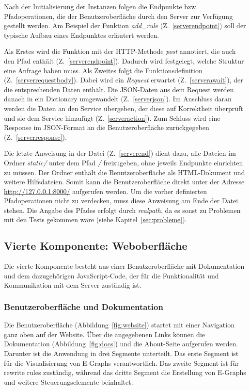 Nach der Initialisierung der Instanzen folgen die Endpunkte bzw. Pfadoperationen, die der Benutzeroberfläche durch den Server zur Verfügung gestellt werden.
Am Beispiel der Funktion \textit{add\_rule} (Z.~\ref{serverendpoint}) soll der typische Aufbau eines Endpunktes erläutert werden.

Als Erstes wird die Funktion mit der HTTP-Methode \textit{post} annotiert, die auch den Pfad enthält (Z.~\ref{serverendpoint}).
Dadurch wird festgelegt, welche Struktur eine Anfrage haben muss.
Als Zweites folgt die Funktionsdefinition (Z.~\ref{serverrequestbody}). Dabei wird ein \textit{Request} erwartet (Z.~\ref{serverawait}), der die entsprechenden Daten enthält. 
Die JSON-Daten aus dem Request werden danach in ein Dictionary umgewandelt (Z.~\ref{serverjson}).
Im Anschluss daran werden die Daten an den Service übergeben, der diese auf Korrektheit überprüft und sie dem Service hinzufügt (Z.~\ref{serveraction}).
Zum Schluss wird eine Response im JSON-Format an die Benutzeroberfläche zurückgegeben (Z.~\ref{serverresponse}).

Die letzte Anweisung in der Datei (Z.~\ref{serverend}) dient dazu, alle Dateien im Ordner \textit{static/} unter dem Pfad \textit{/} freizugeben, ohne jeweils Endpunkte einrichten zu müssen.
Der Ordner enthält die Benutzeroberfläche als HTML-Dokument und weitere Hilfsdateien. Somit kann die Benutzeroberfläche direkt unter der Adresse \url{http://127.0.0.1:8000/}
aufgerufen werden. Um die vorher definierten Pfadoperationen nicht zu verdecken, muss diese Anweisung am Ende der Datei stehen.
Die Angabe des Pfades erfolgt durch \textit{realpath}, da es sonst zu Problemen mit den Tests gekommen wäre (siehe Kapitel~\ref{sec:probleme}).

\subsection{Vierte Komponente: Weboberfläche}

Die vierte Komponente besteht aus einer Benutzeroberfläche mit Dokumentation und dem dazugehörigen JavaScript-Code, der für die Funktionalität und Kommunikation mit dem Server
zuständig ist.

\subsubsection{Benutzeroberfläche und Dokumentation}

Die Benutzeroberfläche (Abbildung~\ref{fig:website}) startet mit einer Navigation ganz oben auf der Website. Über die angegebenen Links können die Dokumentation (Abbildung~\ref{fig:docs}) und die About-Seite aufgerufen werden.
Darunter ist die Anwendung in drei Segmente unterteilt. Das erste Segment ist für die Visualisierung von E-Graphs verantwortlich. Das zweite Segment ist für rewrite rules zuständig, während das dritte Segment
die Erstellung von E-Graphs und weitere Steuerungselemente beinhaltet.

